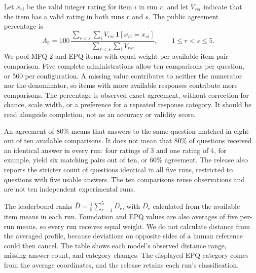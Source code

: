 \documentclass[11pt]{article}
\begin{document}
Let $x_{ri}$ be the valid integer rating for item $i$ in run $r$, and let $V_{rsi}$ indicate that the item has a valid rating in both runs $r$ and $s$. The public agreement percentage is
\begin{equation}
A_5 = 100\,\frac{\sum_{r<s}\sum_i V_{rsi}\,\mathbf{1}[x_{ri}=x_{si}]}{\sum_{r<s}\sum_i V_{rsi}},\qquad 1\leq r<s\leq 5.
\end{equation}
We pool MFQ-2 and EPQ items with equal weight per available item-pair comparison. Five complete administrations allow ten comparisons per question, or 560 per configuration. A missing value contributes to neither the numerator nor the denominator, so items with more available responses contribute more comparisons. The percentage is observed exact agreement, without correction for chance, scale width, or a preference for a repeated response category. It should be read alongside completion, not as an accuracy or validity score.

An agreement of 80\% means that answers to the same question matched in eight out of ten available comparisons. It does not mean that 80\% of questions received an identical answer in every run: four ratings of 3 and one rating of 4, for example, yield six matching pairs out of ten, or 60\% agreement. The release also reports the stricter count of questions identical in all five runs, restricted to questions with five usable answers. The ten comparisons reuse observations and are not ten independent experimental runs.

The leaderboard ranks $\overline{D}=\frac{1}{5}\sum_{r=1}^{5}D_r$, with $D_r$ calculated from the available item means in each run. Foundation and EPQ values are also averages of five per-run means, so every run receives equal weight. We do not calculate distance from the averaged profile, because deviations on opposite sides of a human reference could then cancel. The table shows each model's observed distance range, missing-answer count, and category changes. The displayed EPQ category comes from the average coordinates, and the release retains each run's classification.
\end{document}
